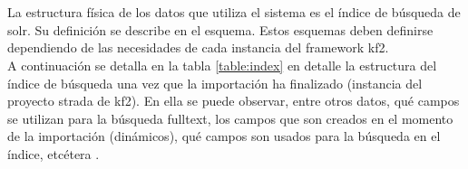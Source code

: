 \section{}
\begin{comment}
En esta sección se define la estructura física de datos que utilizará el sistema, a partir del modelo de conceptual de clases, de manera que teniendo presente los requisitos establecidos para el sistema de información y las particularidades del entorno tecnológico, se consiga un acceso eficiente de los datos.
La estructura física se compone de tablas, índices, procedimientos almacenados, secuencias y otros elementos dependientes del SGBD a utilizar.
\end{comment}
La estructura física de los datos que utiliza el sistema es el índice de búsqueda de \gls{solr}. Su definición se describe en el esquema. Estos esquemas deben definirse dependiendo de las necesidades de cada instancia del \gls{framework} \gls{kf2}.\\

A continuación se detalla en la tabla \ref{table:index} en detalle la estructura del índice de búsqueda una vez que la importación ha finalizado (instancia del proyecto \gls{strada} de \gls{kf2}). En ella se puede observar, entre otros datos, qué campos se utilizan para la búsqueda \gls{fulltext}, los campos que son creados en el momento de la importación (dinámicos), qué campos son usados para la búsqueda en el índice, etcétera .

